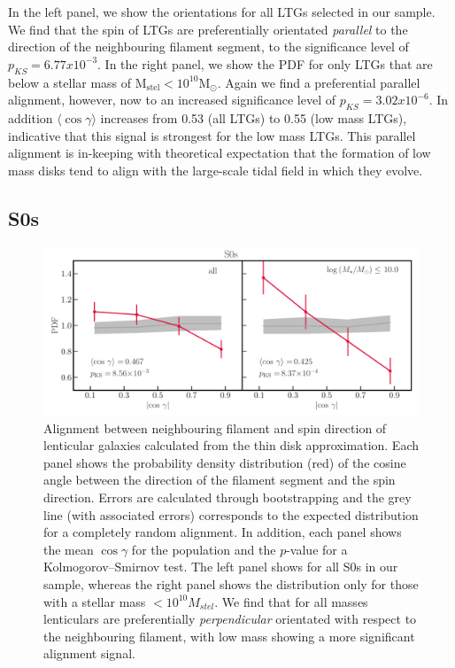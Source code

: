 In the left panel, we show the orientations for all LTGs selected in our sample. We find that the spin of LTGs are preferentially orientated \textit{parallel} to the direction of the neighbouring filament segment, to the significance level of $p_{KS} = 6.77 x 10^{-3}$. In the right panel, we show the PDF for only LTGs that are below a stellar mass of $\mathrm{M_{stel} < 10^{10} M_{\odot}}$. Again we find a preferential parallel alignment, however, now to an increased significance level of $p_{KS} = 3.02 x 10^{-6}$. In addition $\langle \cos \gamma \rangle$ increases from 0.53 (all LTGs) to 0.55 (low mass LTGs), indicative that this signal is strongest for the low mass LTGs. This parallel alignment is in-keeping with theoretical expectation that the formation of low mass disks tend to align with the large-scale tidal field in which they evolve. 

\subsection{S0s}
\begin{figure}
    \centering
    \includegraphics[width=\linewidth]{thesis/latex/cw_spin/spin_fil_S0s_2in1.pdf}
    \caption{Alignment between neighbouring filament and spin direction of lenticular galaxies calculated from the thin disk approximation. Each panel shows the probability density distribution (red) of the cosine angle between the direction of the filament segment and the spin direction. Errors are calculated through bootstrapping and the grey line (with associated errors) corresponds to the expected distribution for a completely random alignment. In addition, each panel shows the mean $\cos \gamma$ for the population and the $p$-value for a Kolmogorov--Smirnov test. The left panel shows for all S0s in our sample, whereas the right panel shows the distribution only for those with a stellar mass $< 10^{10} M_{stel}$. We find that for all masses lenticulars are preferentially \textit{perpendicular} orientated with respect to the neighbouring filament, with low mass showing a more significant alignment signal.}
    \label{fig:s0_spin_alignment}
\end{figure}


